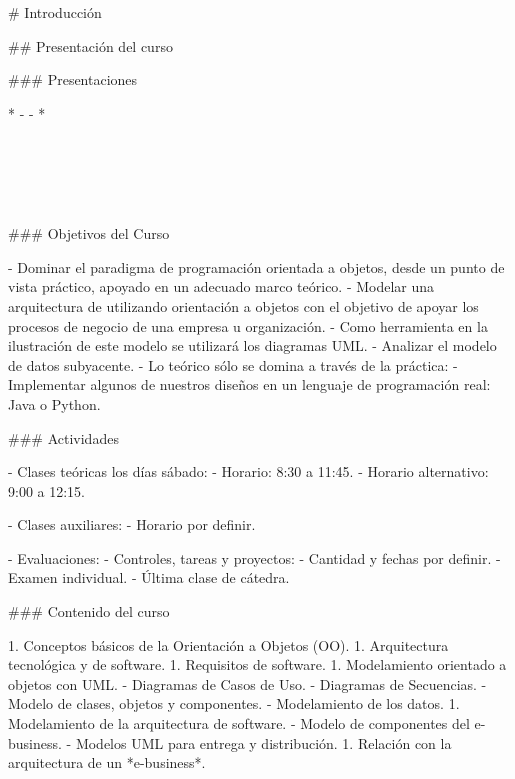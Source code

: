 # Introducción

## Presentación del curso

### Presentaciones

* 
    - 
    - 
    \pause
* 
    \pause

    \vspace{-6mm}
    \begin{center}
    \hspace{20mm}\begin{customRoundedBox}{}
    \centering
        \\
        \vspace{4mm}
        \\
    \end{customRoundedBox}
    
    \hspace{60mm}\begin{customRoundedBox}{}
    \centering
        \\
    \end{customRoundedBox}
    \end{center}

### Objetivos del Curso

- Dominar el paradigma de programación orientada a objetos, desde un punto de vista 
  práctico, apoyado en un adecuado marco teórico.
  \pause
- Modelar una arquitectura de  utilizando orientación a objetos
  con el objetivo de apoyar los procesos de negocio
  de una empresa u organización.
  \pause
- Como herramienta en la ilustración de este modelo se utilizará los diagramas UML.
  \pause
- Analizar el modelo de datos subyacente.
  \pause
- Lo teórico sólo se domina a través de la práctica: 
    - Implementar algunos de nuestros diseños en un lenguaje de programación real: Java o Python.

### Actividades

- Clases teóricas los días sábado:
    - Horario: 8:30 a 11:45.
    - Horario alternativo: 9:00 a 12:15.

- Clases auxiliares:
    - Horario por definir.

- Evaluaciones:
    - Controles, tareas y proyectos:
        - Cantidad y fechas por definir.
    - Examen individual.
        - Última clase de cátedra.


### Contenido del curso

1. Conceptos básicos de la Orientación a Objetos (OO).
1. Arquitectura tecnológica y de software.
1. Requisitos de software.
1. Modelamiento orientado a objetos con UML.
    - Diagramas de Casos de Uso.
    - Diagramas de Secuencias.
    - Modelo de clases, objetos y componentes.
    - Modelamiento de los datos.
1. Modelamiento de la arquitectura de software.
    - Modelo de componentes del e-business.
    - Modelos UML para entrega y distribución.
1. Relación con la arquitectura de un *e-business*.
